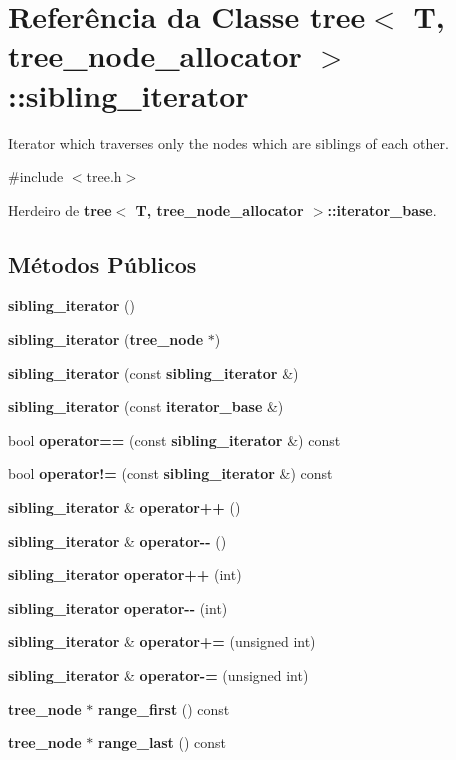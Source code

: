\section{Referência da Classe tree$<$ T, tree\+\_\+node\+\_\+allocator $>$\+:\+:sibling\+\_\+iterator}
\label{classtree_1_1sibling__iterator}


Iterator which traverses only the nodes which are siblings of each other.  




{\ttfamily \#include $<$tree.\+h$>$}



Herdeiro de {\bf tree$<$ T, tree\+\_\+node\+\_\+allocator $>$\+::iterator\+\_\+base}.

\subsection*{Métodos Públicos}
\begin{DoxyCompactItemize}
\item 
{\bf sibling\+\_\+iterator} ()
\item 
{\bf sibling\+\_\+iterator} ({\bf tree\+\_\+node} $\ast$)
\item 
{\bf sibling\+\_\+iterator} (const {\bf sibling\+\_\+iterator} \&)
\item 
{\bf sibling\+\_\+iterator} (const {\bf iterator\+\_\+base} \&)
\item 
bool {\bf operator==} (const {\bf sibling\+\_\+iterator} \&) const 
\item 
bool {\bf operator!=} (const {\bf sibling\+\_\+iterator} \&) const 
\item 
{\bf sibling\+\_\+iterator} \& {\bf operator++} ()
\item 
{\bf sibling\+\_\+iterator} \& {\bf operator-\/-\/} ()
\item 
{\bf sibling\+\_\+iterator} {\bf operator++} (int)
\item 
{\bf sibling\+\_\+iterator} {\bf operator-\/-\/} (int)
\item 
{\bf sibling\+\_\+iterator} \& {\bf operator+=} (unsigned int)
\item 
{\bf sibling\+\_\+iterator} \& {\bf operator-\/=} (unsigned int)
\item 
{\bf tree\+\_\+node} $\ast$ {\bf range\+\_\+first} () const 
\item 
{\bf tree\+\_\+node} $\ast$ {\bf range\+\_\+last} () const 
\end{DoxyCompactItemize}
